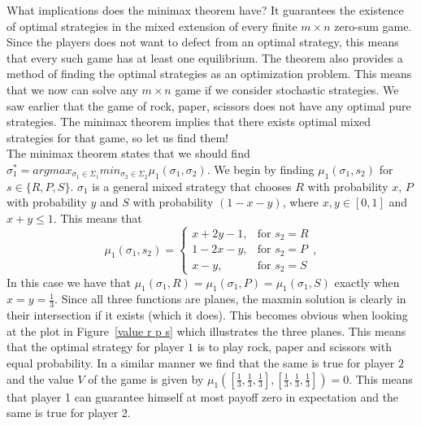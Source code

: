 \documentclass{article}
\theoremstyle{definition}
\theoremstyle{remark}
\begin{document}
What implications does the minimax theorem have? It guarantees the
existence of optimal strategies in the mixed extension of every finite
$m\times n$ zero-sum game. Since the players does not want to defect
from an optimal strategy, this means that every such game has at least
one equilibrium. The theorem also provides a method of finding the
optimal strategies as an optimization problem. This means that we now
can solve any $m\times n$ game if we consider stochastic strategies. We
saw earlier that the game of rock, paper, scissors does not have any
optimal pure strategies. The minimax theorem implies that there exists
optimal mixed strategies for that game, so let us find them!\\

The minimax theorem states that we should find $\sigma_1^* = argmax_{\sigma _1 \in
  \Sigma_1} min_{\sigma _2 \in \Sigma_2} \mu_1(\sigma_1,\sigma_2)$. We
begin by finding $\mu_1(\sigma_1,s_2)$ for $s \in
\{R,P,S\}$. $\sigma_1$ is a general mixed strategy that chooses $R$
with probability $x$, $P$ with probability $y$ and $S$ with
probability $(1-x-y)$, where $x,y \in [0,1]$ and $x+y \leq 1$. This means
that $$\mu_1(\sigma_1, s_2) = \begin{cases}
         x+2y-1, & \text{for } s_2 =  R\\
        1-2x-y, & \text{for } s_2 =  P\\
        x-y, & \text{for } s_2 =  S
      \end{cases},$$
In this case we have that $\mu_1(\sigma_1, R) =  \mu_1(\sigma_1,
P) = \mu_1(\sigma_1, S)$ exactly when $x = y = \frac{1}{3}$. Since
all three functions are planes, the maxmin solution is clearly in
their intersection if it exists (which it does). This becomes obvious
when looking at the plot in Figure~\ref{value r p s} which illustrates
the three planes. This means that the
optimal strategy for player $1$ is to play rock, paper and scissors
with equal probability. In a similar manner we find that the same is
true for player $2$ and the value $V$ of the game is given by
$\mu_1([\frac{1}{3},\frac{1}{3},\frac{1}{3}],[\frac{1}{3},\frac{1}{3},\frac{1}{3}])
= 0$. This means that player 1 can guarantee himself at most payoff zero in
expectation and the same is true for player 2.
\end{document}
